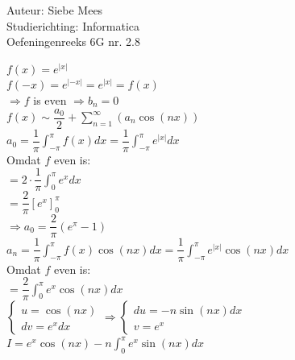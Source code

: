 \documentclass[a4paper]{article}
\begin{document}
  
\noindent \large Auteur: Siebe Mees \\
\noindent \large Studierichting: Informatica\\
\noindent \large Oefeningenreeks 6G nr. 2.8\\

\medskip

\normalsize

$f(x)=e^{|x|}$\\

$f(-x)=e^{|-x|}=e^{|x|}=f(x)$\\

$\Rightarrow f $ is even $ \Rightarrow b_n=0$\\

$f(x)\sim \dfrac{a_0}{2}+\displaystyle\sum_{n=1}^{\infty}(a_n\cos(nx))$\\

$a_0=\dfrac{1}{\pi}\displaystyle\int_{-\pi}^{\pi}f(x)dx=\dfrac{1}{\pi}\displaystyle\int_{-\pi}^{\pi}e^{|x|}dx$\\

Omdat $f$ even is:\\

$ = 2\cdot\dfrac{1}{\pi}\displaystyle\int_{0}^{\pi}e^xdx$\\

$=\dfrac{2}{\pi}\left[e^x\right]_{0}^{\pi}$\\

$ \Rightarrow a_0 =\dfrac{2}{\pi}(e^{\pi}-1)$\\

$a_n=\dfrac{1}{\pi}\displaystyle\int_{-\pi}^{\pi}f(x)\cos(nx)dx=\dfrac{1}{\pi}\displaystyle\int_{-\pi}^{\pi}e^{|x|}\cos(nx)dx$\\

Omdat $f$ even is:\\

$=\dfrac{2}{\pi}\displaystyle\int_{0}^{\pi}e^x\cos(nx)dx$\\

$ \left \{
\begin{array}{l}
u=\cos(nx) \\
dv=e^xdx
\end{array}
\right .
\Rightarrow
\left \{
\begin{array}{l}
du=-n\sin(nx)dx \\
v=e^x
\end{array}
\right . $\\

$I=e^x\cos(nx)-n\displaystyle\int_{0}^{\pi} e^x\sin(nx)dx$\\
\end{document}
